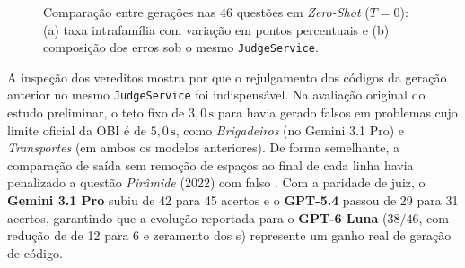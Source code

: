 \begin{table}[!htbp]
\centering
\caption[Desempenho consolidado na PP5 sob paridade de juiz]{Desempenho consolidado dos quatro modelos nas $46$ questões em  \textit{Zero-Shot} ($T = 0{,}0$) sob o mesmo \texttt{JudgeService}.}
\label{tab:res-pp5-consolidado}
\small
{}
\par{}
\end{table}

\begin{figure}[!htbp]
\centering

\caption[Pass@1 e taxonomia de falhas na PP5]{Comparação entre gerações nas $46$ questões em  \textit{Zero-Shot} ($T=0$): (a) taxa  intrafamília com variação em pontos percentuais e (b) composição dos erros sob o mesmo \texttt{JudgeService}.}
\label{fig:res-pp5-pass1-erros}
\end{figure}
\FloatBarrier

A inspeção dos vereditos mostra por que o rejulgamento dos códigos da geração anterior no mesmo \texttt{JudgeService} foi indispensável. Na avaliação original do estudo preliminar, o teto fixo de $3{,}0\,\mathrm{s}$ para  havia gerado falsos  em problemas cujo limite oficial da OBI é de $5{,}0\,\mathrm{s}$, como \textit{Brigadeiros} (no Gemini 3.1 Pro) e \textit{Transportes} (em ambos os modelos anteriores). De forma semelhante, a comparação de saída sem remoção de espaços ao final de cada linha havia penalizado a questão \textit{Pirâmide} (2022) com falso . Com a paridade de juiz, o \textbf{Gemini 3.1 Pro} subiu de 42 para 45 acertos e o \textbf{GPT-5.4} passou de 29 para 31 acertos, garantindo que a evolução reportada para o \textbf{GPT-6 Luna} ($38/46$, com redução de  de 12 para 6 e zeramento dos s) represente um ganho real de geração de código.

